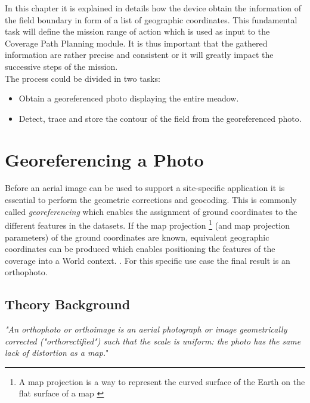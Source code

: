 In this chapter it is explained in details how the device obtain the information of the field boundary in form of a list of geographic coordinates. 
This fundamental task will define the mission range of action which is used as input to the Coverage Path Planning module. It is thus important that the gathered information are rather precise and consistent or it will greatly impact the successive steps of the mission.\\
The process could be divided in two tasks:
\begin{itemize}
	\item Obtain a georeferenced photo displaying the entire meadow.
	\item Detect, trace and store the contour of the field from the georeferenced photo.
\end{itemize}

\section{Georeferencing a Photo} %
\label{sec:georeferenced_photo}
Before an aerial image can be used to support a site-specific application it is essential to perform the geometric corrections and geocoding. This is commonly called \textit{georeferencing} which enables the assignment of ground coordinates to the different features in the datasets. If the map projection \footnote{A map projection is a way to represent the curved surface
of the Earth on the flat surface of a map \cite{PosAccuracyGE}} (and map projection parameters) of the ground coordinates are known, equivalent geographic coordinates can be produced which enables positioning the features of the coverage into a World context. \cite{georefPractice}.
For this specific use case the final result is an orthophoto.

\subsection{Theory Background} %
\label{sub:theory_background}
\textit{"An orthophoto or orthoimage is an aerial photograph or image geometrically corrected ("orthorectified") such that the scale is uniform: the photo has the same lack of distortion as a map.}"\cite{orthophoto&GIS}\\

